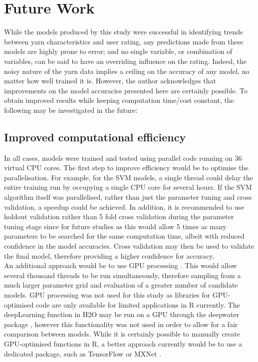 \documentclass[journal]{IEEEtran}
\begin{document}
\section{Future Work}

While the models produced by this study were successful in identifying trends between yarn characteristics and user rating, any predictions made from these models are highly prone to error; and no single variable, or combination of variables, can be said to have an overriding influence on the rating. Indeed, the noisy nature of the yarn data implies a ceiling on the accuracy of any model, no matter how well trained it is.
However, the author acknowledges that improvements on the model accuracies presented here are certainly possible.  To obtain improved results while keeping computation time/cost constant, the following may be investigated in the future:

\subsection{Improved computational efficiency}
In all cases, models were trained and tested using parallel code running on 36 virtual CPU cores. The first step to improve efficiency would be to optimise the parallelisation. For example, for the SVM models, a single thread could delay the entire training run by occupying a single CPU core for several hours. If the SVM algorithm itself was parallelised, rather than just the parameter tuning and cross validation, a speedup could be achieved. In addition, it is recommended to use holdout validation rather than 5 fold cross validation during the parameter tuning stage since for future studies as this would allow 5 times as many parameters to be searched for the same computation time, albeit with reduced confidence in the model accuracies. Cross validation may then be used to validate the final model, therefore providing a higher confidence for accuracy.\\
An additional approach would be to use GPU processing \cite{zhou2013}. This would allow several thousand threads to be run simultaneously, therefore sampling from a much larger parameter grid and evaluation of a greater number of candidate models. GPU processing was not used for this study as libraries for GPU-optimised code are only available for limited applications in R currently. The deepLearning function in H2O may be run on a GPU through the deepwater package \cite{dh2o}, however this functionality was not used in order to allow for a fair comparison between models.
While it is certainly possible to manually create GPU-optimised functions in R, a better approach currently would be to use a dedicated package, such as TensorFlow or MXNet \cite{Abadi2015,Chen2015}.
\end{document}
